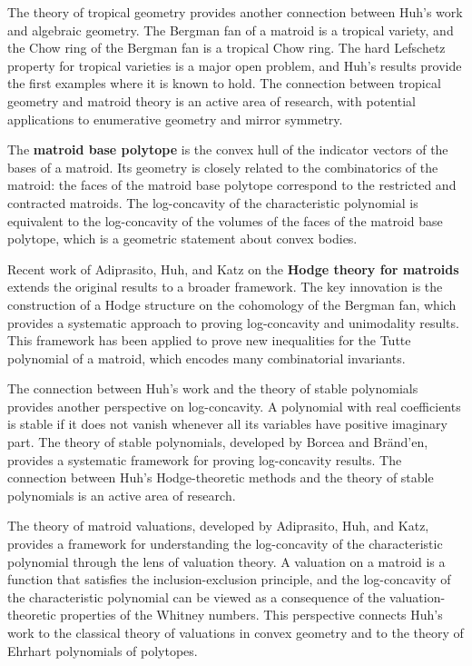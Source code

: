 The theory of tropical geometry provides another connection between Huh's work \cite{huh2015} and algebraic geometry. The Bergman fan of a matroid is a tropical variety, and the Chow ring of the Bergman fan is a tropical Chow ring. The hard Lefschetz property for tropical varieties is a major open problem, and Huh's results provide the first examples where it is known to hold. The connection between tropical geometry and matroid theory is an active area of research, with potential applications to enumerative geometry and mirror symmetry.

The \textbf{matroid base polytope} is the convex hull of the indicator vectors of the bases of a matroid. Its geometry is closely related to the combinatorics of the matroid: the faces of the matroid base polytope correspond to the restricted and contracted matroids. The log-concavity of the characteristic polynomial is equivalent to the log-concavity of the volumes of the faces of the matroid base polytope, which is a geometric statement about convex bodies.

Recent work of Adiprasito, Huh, and Katz on the \textbf{Hodge theory for matroids} extends the original results to a broader framework. The key innovation is the construction of a Hodge structure on the cohomology of the Bergman fan, which provides a systematic approach to proving log-concavity and unimodality results. This framework has been applied to prove new inequalities for the Tutte polynomial of a matroid, which encodes many combinatorial invariants.

The connection between Huh's work \cite{huh2015} and the theory of stable polynomials provides another perspective on log-concavity. A polynomial with real coefficients is stable if it does not vanish whenever all its variables have positive imaginary part. The theory of stable polynomials, developed by Borcea and Br\"and'en, provides a systematic framework for proving log-concavity results. The connection between Huh's Hodge-theoretic methods and the theory of stable polynomials is an active area of research.

The theory of matroid valuations, developed by Adiprasito, Huh, and Katz, provides a framework for understanding the log-concavity of the characteristic polynomial through the lens of valuation theory. A valuation on a matroid is a function that satisfies the inclusion-exclusion principle, and the log-concavity of the characteristic polynomial can be viewed as a consequence of the valuation-theoretic properties of the Whitney numbers. This perspective connects Huh's work \cite{huh2015} to the classical theory of valuations in convex geometry and to the theory of Ehrhart polynomials of polytopes.

